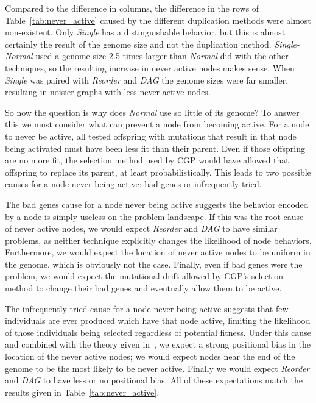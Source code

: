\documentclass[journal]{IEEEtran}
\begin{document}
Compared to the difference in columns, the difference in the rows of Table~\ref{tab:never_active}
caused by the different duplication methods were almost non-existent.  Only
\emph{Single} has a distinguishable behavior, but this is almost certainly the result
of the genome size and not the duplication method.  \emph{Single-Normal} used
a genome size 2.5 times larger than \emph{Normal} did with the other techniques,
so the resulting increase in never active nodes makes sense.  When \emph{Single}
was paired with \emph{Reorder} and \emph{DAG} the genome sizes were far smaller,
resulting in noisier graphs with less never active nodes.

So now the question is why does \emph{Normal} use so little of its genome?  To
answer this we must consider what can prevent a node from becoming active.  For
a node to never be active, all tested offspring with mutations that result in that node being activated
must have been less fit than their parent.  Even if those offspring are no more fit, the selection method
used by CGP would have allowed that offspring to replace its parent, at least probabilistically.  This leads
to two possible causes for a node never being active: bad genes or infrequently tried.

The bad genes cause for a node never being active suggests the behavior encoded
by a node is simply useless on the problem landscape.  If this was the root cause
of never active nodes, we would expect \emph{Reorder} and \emph{DAG} to have
similar problems, as neither technique explicitly changes the likelihood of node
behaviors.  Furthermore, we would expect the location of never active nodes to be
uniform in the genome, which is obviously not the case.  Finally, even if bad
genes were the problem, we would expect the mutational drift allowed by CGP's
selection method to change their bad genes and eventually allow them to be active.

The infrequently tried cause for a node never being active suggests that few
individuals are ever produced which have that node active, limiting the likelihood
of those individuals being selected regardless of potential fitness.  Under this
cause and combined with the theory given in~\cite{goldman:2013:ordering}, we
expect a strong positional bias in the location of the never active nodes;
we would expect nodes near the end of the genome to be the most likely to be never active.
Finally we would expect \emph{Reorder} and \emph{DAG} to have less or no positional bias.
All of these expectations match the results given in Table~\ref{tab:never_active}.
\end{document}
